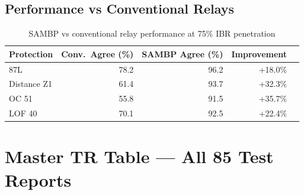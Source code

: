\documentclass[11pt,a4paper]{report}
\begin{document}
\section{Performance vs Conventional Relays}

\begin{table}[ht]
\centering
\caption{SAMBP vs conventional relay performance at 75\% IBR penetration}
\label{tab:vs_conventional}
\begin{tabular}{lrrrr}
\toprule
Protection & Conv.\ Agree (\%) & SAMBP Agree (\%) & Improvement \\
\midrule
87L & 78.2 & 96.2 & +18.0\% \\
Distance Z1 & 61.4 & 93.7 & +32.3\% \\
OC 51 & 55.8 & 91.5 & +35.7\% \\
LOF 40 & 70.1 & 92.5 & +22.4\% \\
\bottomrule
\end{tabular}
\end{table}

\chapter{Master TR Table — All 85 Test Reports}
\label{ch:tr_table}
\end{document}
